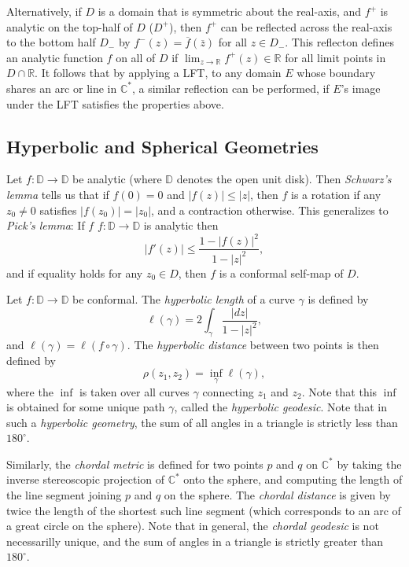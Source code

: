 \documentclass[12pt]{article}
\begin{document}
Alternatively, if $D$ is a domain that is symmetric about the real-axis,
and $f^+$ is analytic on the top-half of $D$ ($D^+$), then $f^+$ can be
reflected across the real-axis to the bottom half $D_-$ by
$f^-(z) = {\overline f({\overline z})}$ for all $z\in D_-$.
This reflecton defines an analytic function $f$ on all of $D$ if
$\lim_{z\rightarrow\mathbb{R}} f^+(z) \in\mathbb{R}$ for all limit points
in $D\cap\mathbb{R}$. It follows that by applying a LFT, to any domain
$E$ whose boundary shares an arc or line in $\mathbb{C}^*$, a similar
reflection can be performed, if $E$'s image under the LFT satisfies
the properties above.

\subsection*{Hyperbolic and Spherical Geometries}

Let $f : \mathbb{D} \rightarrow \mathbb{D}$ be analytic (where $\mathbb{D}$
denotes the open unit disk). Then {\it Schwarz's lemma} tells us that
if $f(0)=0$ and $|f(z)| \leq |z|$, then $f$ is a rotation if any
$z_0\neq 0$ satisfies $|f(z_0)| = |z_0|$, and a contraction otherwise.
This generalizes to {\it Pick's lemma}: If $f$
$f:\mathbb{D}\rightarrow\mathbb{D}$ is analytic then
$$
|f'(z)| \leq \frac{1-|f(z)|^2}{1-|z|^2},
$$
and if equality holds for any $z_0\in D$, then $f$ is a conformal
self-map of $D$.

Let $f : \mathbb{D} \rightarrow \mathbb{D}$ be conformal.
The {\it hyperbolic length} of a curve $\gamma$ is defined by
$$
\ell(\gamma) = 2\int_\gamma \frac{|dz|}{1-|z|^2},
$$
and $\ell(\gamma) = \ell(f\circ \gamma)$.
The {\it hyperbolic distance} between two points is then defined by
$$
\rho(z_1, z_2) = \inf_\gamma \ell(\gamma),
$$
where the $\inf$ is taken over all curves $\gamma$ connecting
$z_1$ and $z_2$.
Note that this $\inf$ is obtained for some unique path $\gamma$,
called the {\it hyperbolic geodesic}.
Note that in such a {\it hyperbolic geometry}, the sum of all angles
in a triangle is strictly less than $180^\circ$.

Similarly, the {\it chordal metric} is defined for two points $p$ and
$q$ on $\mathbb{C}^*$ by taking the inverse stereoscopic projection of
$\mathbb{C}^*$ onto the sphere, and computing the length of the line
segment joining $p$ and $q$ on the sphere. The {\it chordal distance}
is given by twice the length of the shortest such line segment
(which corresponds to an arc of a great circle on the sphere).
Note that in general, the {\it chordal geodesic} is not necessarilly
unique, and the sum of angles in a triangle is strictly greater than
$180^\circ$.
\end{document}
